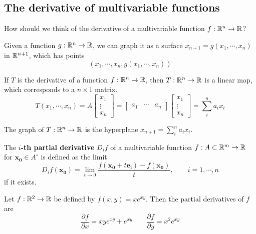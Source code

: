 \subsection{The derivative of multivariable functions}

\begin{question}
    How should we think of the derivative of a multivariable function $f: \mathbb{R}^n \to \mathbb{R}$?
    \end{question}

Given a function $g: \mathbb{R}^n \to \mathbb{R}$, we can graph it as a surface $x_{n+1} = g(x_1, \cdots, x_n)$ in $\mathbb{R}^{n+1}$, which has points $$(x_1,\cdots, x_n, g(x_1, \cdots, x_n))$$
    
    
    If $T$ is the derivative of a function $f: \mathbb{R}^n \to \mathbb{R}$, then $T : \mathbb{R}^n \to \mathbb{R}$ is a linear map, which corresponds to a $n \times 1$ matrix.
    \begin{equation*}
T(x_1, \cdots, x_n) = A\begin{bmatrix}
x_1 \\
\vdots\\
x_n
\end{bmatrix}
=
\begin{bmatrix}
a_1 & \cdots & a_n
\end{bmatrix}\begin{bmatrix}
x_1 \\
\vdots\\
x_n
\end{bmatrix}
= \sum_i^n a_ix_i
\end{equation*}

\begin{proposition}
The graph of $T : \mathbb{R}^n \to \mathbb{R}$ is the hyperplane $x_{n+1} = \sum_i^n a_ix_i$.
\end{proposition}

\begin{definition}
    The \textbf{$i$-th partial derivative} $D_if$ of a multivariable function $f : A \subset \mathbb{R}^m \to \mathbb{R}$ for $\bm{x_0} \in A^\circ$ is defined as the limit
    $$D_if(\bm{x_0}) =  \lim_{t \to 0} \frac{f(\bm{x_0}+t\bm{e_i})-f(\bm{x_0})}{t}, \qquad i = 1, \cdots, n$$
    if it exists.
    
    \end{definition}

    \begin{example}
        Let $f: \mathbb{R}^2 \to \mathbb{R}$ be defined by $f(x,y) = xe^{xy}$.  Then the partial derivatives of $f$ are
        $$\frac{\partial f}{\partial x} = xye^{xy} + e^{xy} \qquad \frac{\partial f}{\partial y} = x^2e^{xy}$$
    \end{example}
    

